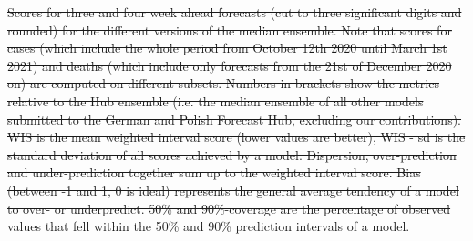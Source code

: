 \documentclass[10pt,letterpaper]{article}
\providecommand{\DIFdeltex}[1]{{\protect\color{red}\sout{#1}}}                      %
\providecommand{\DIFdelFL}[1]{\DIFdel{#1}} %
\providecommand{\DIFdel}[1]{\texorpdfstring{\DIFdeltex{#1}}{}} %
\begin{document}
{%
\DIFdelFL{Scores for three and four week ahead forecasts (cut to three significant digits and rounded) for the different versions of the median ensemble. Note that scores for cases (which include the whole period from October 12th 2020 until March 1st 2021) and deaths (which include only forecasts from the 21st of December 2020 on) are computed on different subsets. Numbers in brackets show the metrics relative to the Hub ensemble (i.e. the median ensemble of all other models submitted to the German and Polish Forecast Hub, excluding our contributions). WIS is the mean weighted interval score (lower values are better), WIS - sd is the standard deviation of all scores achieved by a model. Dispersion, over-prediction and under-prediction together sum up to the weighted interval score. Bias (between -1 and 1, 0 is ideal) represents the general average tendency of a model to over- or underpredict. 50\% and 90\%-coverage are the percentage of observed values that fell within the 50\% and 90\% prediction intervals of a model.}%
\DIFdelFL{\hspace{\textwidth}}}
\end{document}
